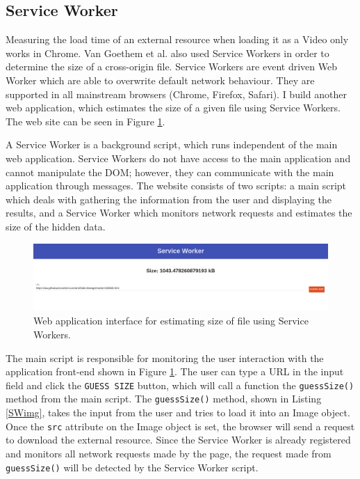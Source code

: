 \documentclass[10pt,a4paper,twoside]{book}
\begin{document}
\subsection{Service Worker}
\label{webSW}

Measuring the load time of an external resource when loading it as a Video only works in Chrome. Van Goethem et al. \cite{van2015clock} also used Service Workers in order to determine the size of a cross-origin file. Service Workers are event driven Web Worker which are able to overwrite default network behaviour. They are supported in all mainstream browsers (Chrome, Firefox, Safari). I build another web application, which estimates the size of a given file using Service Workers. The web site can be seen in Figure \ref{fig:swguess}.

A Service Worker is a background script, which runs independent of the main web application. Service Workers do not have access to the main application and cannot manipulate the DOM; however, they can communicate with the main application through messages. The website consists of two scripts: a main script which deals with gathering the information from the user and displaying the results, and a Service Worker which monitors network requests and estimates the size of the hidden data.

\begin{figure}[h]
\centering
\includegraphics[width=\textwidth]{figures/sw_size.png}
\caption{Web application interface for estimating size of file using Service Workers.}
\label{fig:swguess}
\end{figure}

The main script is responsible for monitoring the user interaction with the application front-end shown in Figure \ref{fig:swguess}. The user can type a URL in the input field and click the \texttt{GUESS SIZE} button, which will call a function the \texttt{guessSize()} method from the main script. The \texttt{guessSize()} method, shown in Listing \ref{SWimg}, takes the input from the user and tries to load it into an Image object. Once the \texttt{src} attribute on the Image object is set, the browser will send a request to download the external resource. Since the Service Worker is already registered and monitors all network requests made by the page, the request made from \texttt{guessSize()} will be detected by the Service Worker script.
\end{document}

